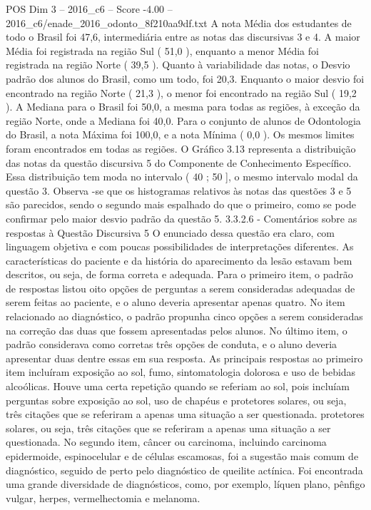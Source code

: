 \begin{textsample}{POS Dim 3 – 2016\_c6 – Score -4.00 – 2016\_c6/enade\_2016\_odonto\_8f210aa9df.txt}
A nota Média dos estudantes de todo o Brasil foi 47,6, intermediária entre as notas das discursivas 3 e 4.
A maior Média foi registrada na região Sul ( 51,0 ), enquanto a menor Média foi registrada na região Norte ( 39,5 ).
Quanto à variabilidade das notas, o Desvio padrão dos alunos do Brasil, como um todo, foi 20,3.
Enquanto o maior desvio foi encontrado na região Norte ( 21,3 ), o menor foi encontrado na região Sul ( 19,2 ).
A Mediana para o Brasil foi 50,0, a mesma para todas as regiões, à exceção da região Norte, onde a Mediana foi 40,0.
Para o conjunto de alunos de Odontologia do Brasil, a nota Máxima foi 100,0, e a nota Mínima ( 0,0 ).
Os mesmos limites foram encontrados em todas as regiões.
O Gráfico 3.13 representa a distribuição das notas da questão discursiva 5 do Componente de Conhecimento Específico.
Essa distribuição tem moda no intervalo ( 40 ; 50 ], o mesmo intervalo modal da questão 3.
Observa -se que os histogramas relativos às notas das questões 3 e 5 são parecidos, sendo o segundo mais espalhado do que o primeiro, como se pode confirmar pelo maior desvio padrão da questão 5. 3.3.2.6 - Comentários sobre as respostas à Questão Discursiva 5 O enunciado dessa questão era claro, com linguagem objetiva e com poucas possibilidades de interpretações diferentes.
As características do paciente e da história do aparecimento da lesão estavam bem descritos, ou seja, de forma correta e adequada.
Para o primeiro item, o padrão de respostas listou oito opções de perguntas a serem consideradas adequadas de serem feitas ao paciente, e o aluno deveria apresentar apenas quatro.
No item relacionado ao diagnóstico, o padrão propunha cinco opções a serem consideradas na correção das duas que fossem apresentadas pelos alunos.
No último item, o padrão considerava como corretas três opções de conduta, e o aluno deveria apresentar duas dentre essas em sua resposta.
As principais respostas ao primeiro item incluíram exposição ao sol, fumo, sintomatologia dolorosa e uso de bebidas alcoólicas.
Houve uma certa repetição quando se referiam ao sol, pois incluíam perguntas sobre exposição ao sol, uso de chapéus e protetores solares, ou seja, três citações que se referiram a apenas uma situação a ser questionada. protetores solares, ou seja, três citações que se referiram a apenas uma situação a ser questionada.
No segundo item, câncer ou carcinoma, incluindo carcinoma epidermoide, espinocelular e de células escamosas, foi a sugestão mais comum de diagnóstico, seguido de perto pelo diagnóstico de queilite actínica.
Foi encontrada uma grande diversidade de diagnósticos, como, por exemplo, líquen plano, pênfigo vulgar, herpes, vermelhectomia e melanoma.

\end{textsample}
